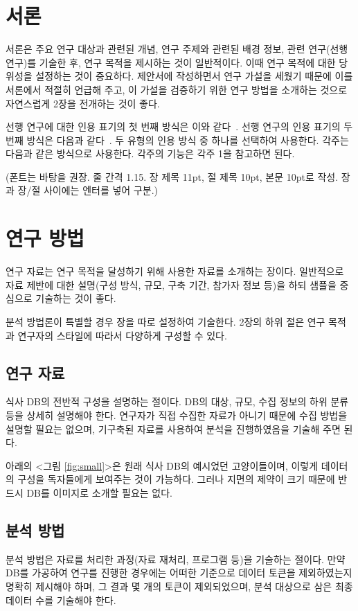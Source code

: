 \section{서론}


서론은 주요 연구 대상과 관련된 개념, 연구 주제와 관련된 배경 정보, 관련 연구(선행 연구)를 기술한 후, 연구 목적을 제시하는 것이 일반적이다. 이때 연구 목적에 대한 당위성을 설정하는 것이 중요하다. 제안서에 작성하면서 연구 가설을 세웠기 때문에 이를 서론에서 적절히 언급해 주고, 이 가설을 검증하기 위한 연구 방법을 소개하는 것으로 자연스럽게 2장을 전개하는 것이 좋다.

선행 연구에 대한 인용 표기의 첫 번째 방식은 이와 같다~\cite{google}. 선행 연구의 인용 표기의 두 번째 방식은 다음과 같다~\citep{texbook}. 두 유형의 인용 방식 중 하나를 선택하여 사용한다. 각주는 다음과 같은 방식으로 사용한다. 각주의 기능은 각주 1을 참고하면 된다.

(폰트는 바탕을 권장. 줄 간격 1.15. 장 제목 11pt, 절 제목 10pt, 본문 10pt로 작성. 장과 장/절 사이에는 엔터를 넣어 구분.)

\section{연구 방법}
연구 자료는 연구 목적을 달성하기 위해 사용한 자료를 소개하는 장이다. 일반적으로 자료 제반에 대한 설명(구성 방식, 규모, 구축 기간, 참가자 정보 등)을 하되 샘플을 중심으로 기술하는 것이 좋다.

분석 방법론이 특별할 경우 장을 따로 설정하여 기술한다. 2장의 하위 절은 연구 목적과 연구자의 스타일에 따라서 다양하게 구성할 수 있다. 

\subsection{연구 자료}
식사 DB의 전반적 구성을 설명하는 절이다. DB의 대상, 규모, 수집 정보의 하위 분류 등을 상세히 설명해야 한다. 연구자가 직접 수집한 자료가 아니기 때문에 수집 방법을 설명할 필요는 없으며, 기구축된 자료를 사용하여 분석을 진행하였음을 기술해 주면 된다. 

아래의 <그림 \ref{fig:small}>은 원래 식사 DB의 예시었던 고양이들이며, 이렇게 데이터의 구성을 독자들에게 보여주는 것이 가능하다. 그러나 지면의 제약이 크기 때문에 반드시 DB를 이미지로 소개할 필요는 없다.

\subsection{분석 방법}
분석 방법은 자료를 처리한 과정(자료 재처리, 프로그램 등)을 기술하는 절이다. 만약 DB를 가공하여 연구를 진행한 경우에는 어떠한 기준으로 데이터 토큰을 제외하였는지 명확히 제시해야 하며, 그 결과 몇 개의 토큰이 제외되었으며, 분석 대상으로 삼은 최종 데이터 수를 기술해야 한다. 

